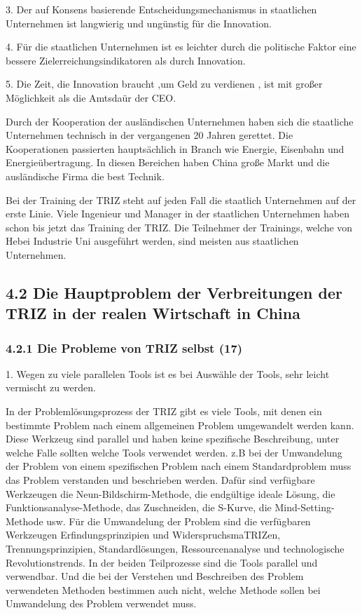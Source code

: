 \documentclass[11pt,a4paper]{article}
\begin{document}
3. Der auf Konsens basierende Entscheidungsmechanismus in staatlichen
Unternehmen ist langwierig und ungünstig für die Innovation.

4.  Für die staatlichen Unternehmen ist es leichter durch die politische
Faktor eine bessere Zielerreichungsindikatoren als durch Innovation.

5. Die Zeit, die Innovation braucht ,um Geld zu  verdienen , ist  mit großer
Möglichkeit als die Amtsdaür der CEO.

Durch der Kooperation der ausländischen Unternehmen haben sich die staatliche
Unternehmen technisch in der vergangenen 20 Jahren gerettet.  Die
Kooperationen passierten hauptsächlich in Branch wie Energie, Eisenbahn und
Energieübertragung. In diesen Bereichen haben China große Markt und die
ausländische Firma die best Technik.

Bei der Training der TRIZ steht auf jeden Fall die staatlich Unternehmen auf
der erste Linie. Viele Ingenieur und Manager in der staatlichen Unternehmen
haben schon bis jetzt das Training der TRIZ. Die Teilnehmer der Trainings,
welche von Hebei Industrie Uni ausgeführt werden, sind meisten aus staatlichen
Unternehmen. 

\subsection{4.2  Die Hauptproblem der Verbreitungen der TRIZ in der realen
  Wirtschaft in China}

\subsubsection{4.2.1 Die Probleme von TRIZ selbst (17)}

1. Wegen zu viele parallelen Tools ist es bei Auswähle der Tools, sehr leicht
vermischt zu werden.

In der Problemlösungsprozess der TRIZ gibt es viele Tools, mit denen ein
bestimmte Problem nach einem allgemeinen Problem umgewandelt werden
kann. Diese Werkzeug sind parallel und haben keine spezifische Beschreibung,
unter welche Falle sollten welche Tools verwendet werden. z.B bei der
Umwandelung der Problem von einem spezifischen Problem nach einem
Standardproblem muss das Problem verstanden und beschrieben werden. Dafür sind
verfügbare Werkzeugen die Neun-Bildschirm-Methode, die endgültige ideale
Lösung, die Funktionsanalyse-Methode, das Zuschneiden, die S-Kurve, die
Mind-Setting-Methode usw. Für die Umwandelung der Problem sind die verfügbaren
Werkzeugen Erfindungsprinzipien und WiderspruchsmaTRIZen, Trennungsprinzipien,
Standardlösungen, Ressourcenanalyse und technologische Revolutionstrends. In
der beiden Teilprozesse sind die Tools parallel und verwendbar. Und die bei
der Verstehen und Beschreiben des Problem verwendeten Methoden bestimmen auch
nicht, welche Methode sollen bei Umwandelung des Problem verwendet muss.
\end{document}
